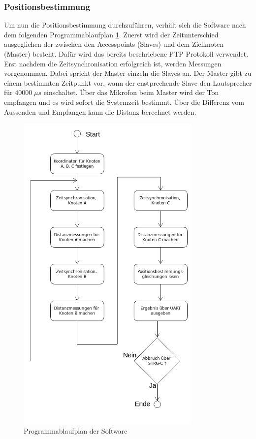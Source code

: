 \subsubsection{Positionsbestimmung}
Um nun die Positionsbestimmung durchzuführen, verhält sich die Software nach dem folgenden Programmablaufplan \ref{img:PAP}. Zuerst wird der Zeitunterschied ausgeglichen der zwischen den Accesspoints (Slaves) und dem Zielknoten (Master) besteht. Dafür wird das bereits beschriebene PTP Protokoll verwendet. Erst nachdem die Zeitsynchronisation erfolgreich ist, werden Messungen vorgenommen. Dabei spricht der Master einzeln die Slaves an. Der Master gibt zu einem bestimmten Zeitpunkt vor, wann der enstprechende Slave den Lautsprecher für $40000 \; \mu s$ einschaltet. Über das Mikrofon beim Master wird der Ton empfangen und es wird sofort die Systemzeit bestimmt. Über die Differenz vom Aussenden und Empfangen kann die Distanz berechnet werden.
\begin{figure}[H]
        \centering
        \includegraphics[width=0.8\textwidth]{images/PAP.png}
        \caption{Programmablaufplan der Software}
        \label{img:PAP}
\end{figure}

